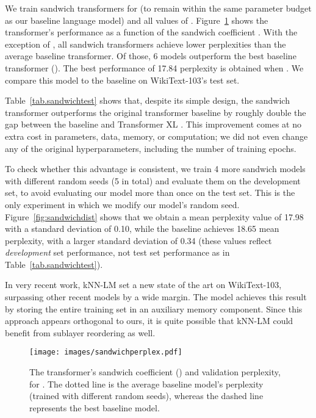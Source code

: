 \documentclass[11pt,a4paper]{article}
\begin{document}
We train sandwich transformers for  (to remain within the same parameter budget as our baseline language model) and all values of . Figure~\ref{fig.sandwichperplexity} shows the transformer's performance as a function of the sandwich coefficient . 
With the exception of , all sandwich transformers achieve lower perplexities than the average baseline transformer.
Of those, 6 models outperform the best baseline transformer ().
The best performance of 17.84 perplexity is obtained when .
We compare this model to the baseline on WikiText-103's test set.

Table~\ref{tab.sandwichtest} shows that, despite its simple design, the sandwich transformer outperforms the original transformer baseline by roughly double the gap between the baseline \cite{baevski2018adaptive} and Transformer XL \cite{transformerXL}.
This improvement comes at no extra cost in parameters, data, memory, or computation; we did not even change any of the original hyperparameters, including the number of training epochs. 

To check whether this advantage is consistent, we train 4 more sandwich models with different random seeds (5 in total) and evaluate them on the development set, to avoid evaluating our model more than once on the test set. This is the only experiment in which we modify our model's random seed.
Figure~\ref{fig:sandwichdist} shows that we obtain a mean perplexity value of 17.98 with a standard deviation of 0.10, while the baseline achieves 18.65 mean perplexity, with a larger standard deviation of 0.34 (these values reflect \emph{development} set performance, not test set performance as in Table~\ref{tab.sandwichtest}).

In very recent work, kNN-LM \cite{urvashi} set a new state of the art on WikiText-103, surpassing other recent models by a wide margin. The model achieves this result by storing the entire training set in an auxiliary memory component. Since this approach appears orthogonal to ours, it is quite possible that kNN-LM could benefit from sublayer reordering as well.


\begin{figure}[t]
\centering
\texttt{[image: images/sandwichperplex.pdf]}
\caption{The transformer's sandwich coefficient () and validation perplexity, for  . The dotted line is the average baseline model's perplexity (trained with different random seeds), whereas the dashed line represents the best baseline model.} 
\label{fig.sandwichperplexity}
\end{figure}
\end{document}
